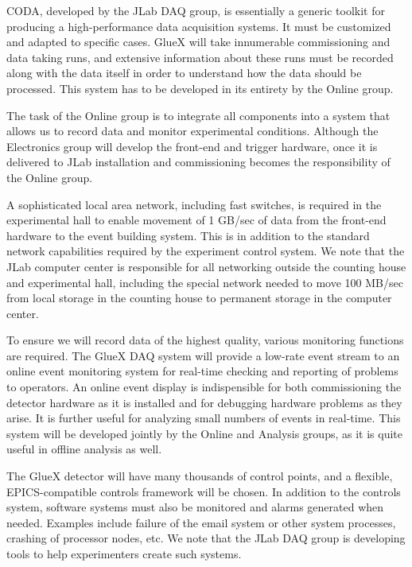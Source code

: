 \documentclass[11pt]{article}
\begin{document}
CODA, developed by the JLab DAQ group, is essentially a generic
toolkit for producing a high-performance data acquisition systems. It
must be customized and adapted to specific cases.  GlueX will take
innumerable commissioning and data taking runs, and extensive
information about these runs must be recorded along with the data
itself in order to understand how the data should be processed.  This
system has to be developed in its entirety by the Online group.



The task of the Online group is to integrate all components into a
system that allows us to record data and monitor experimental
conditions.  Although the Electronics group will develop the front-end
and trigger hardware, once it is delivered to JLab installation and
commissioning becomes the responsibility of the Online group.



A sophisticated local area network, including fast switches, is
required in the experimental hall to enable movement of 1 GB/sec of
data from the front-end hardware to the event building system.  This
is in addition to the standard network capabilities required by the
experiment control system.  We note that the JLab computer center is
responsible for all networking outside the counting house and
experimental hall, including the special network needed to move 100
MB/sec from local storage in the counting house to permanent storage
in the computer center.



To ensure we will record data of the highest quality, various
monitoring functions are required.  The GlueX DAQ system will provide
a low-rate event stream to an online event monitoring system for
real-time checking and reporting of problems to operators.  
An online event display is indispensible for both commissioning the
detector hardware as it is installed and for debugging hardware
problems as they arise.  It is further useful for analyzing small
numbers of events in real-time.  This system will be developed jointly
by the Online and Analysis groups, as it is quite useful in offline
analysis as well.



The GlueX detector will have many thousands of control points, and 
a flexible, EPICS-compatible controls framework will be chosen.
In addition to the controls system, software systems
must also be monitored and alarms generated when needed.
Examples include failure of the email system or other system
processes, crashing of processor nodes, etc.  We note that the JLab
DAQ group is developing tools to help experimenters create such systems.
\end{document}
